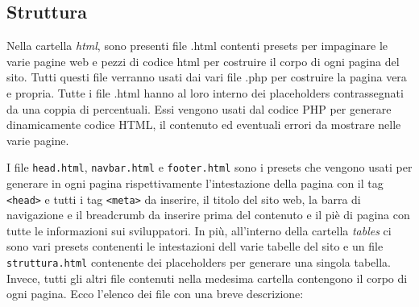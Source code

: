 \documentclass[12pt, a4paper]{article}
\begin{document}
\subsection{Struttura}
Nella cartella \textit{html}, sono presenti file .html contenti presets per impaginare le varie pagine web e pezzi di codice html per costruire il corpo di ogni pagina del sito.
Tutti questi file verranno usati dai vari file .php per costruire la pagina vera e propria. Tutte i file .html hanno al loro interno dei placeholders contrassegnati da una coppia di percentuali. Essi vengono usati
dal codice PHP per generare dinamicamente codice HTML, il contenuto ed eventuali errori da mostrare nelle varie pagine.\par
I file \texttt{head.html}, \texttt{navbar.html} e \texttt{footer.html} sono i presets che vengono usati per generare in ogni pagina rispettivamente l'intestazione della pagina con il tag \texttt{<head>} e tutti i tag \texttt{<meta>}
da inserire, il titolo del sito web, la barra di navigazione e il breadcrumb da inserire prima del contenuto e il piè di pagina con tutte le informazioni sui sviluppatori. In più, all'interno della cartella \textit{tables} ci sono vari presets contenenti le intestazioni dell varie tabelle del sito
e un file \texttt{struttura.html} contenente dei placeholders per generare una singola tabella.
Invece, tutti gli altri file contenuti nella medesima cartella contengono il corpo di ogni pagina. Ecco l'elenco dei file con una breve descrizione:
\end{document}
